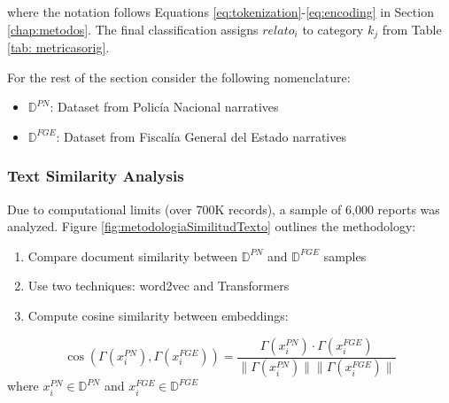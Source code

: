 \documentclass[onecolumn, journal, english, 12pt, a4paper]{IEEEtran} %
\theoremstyle{definition}
\begin{document}
where the notation follows Equations \ref{eq:tokenization}-\ref{eq:encoding} in Section \ref{chap:metodos}. The final classification assigns $relato_i$ to category $k_j$ from Table \ref{tab: metricasorig}.

For the rest of the section consider the following nomenclature:

\begin{itemize}
\item $\mathbb{D}^{PN}$: Dataset from Policía Nacional narratives
\item $\mathbb{D}^{FGE}$: Dataset from Fiscalía General del Estado narratives 
\end{itemize}

\subsubsection{Text Similarity Analysis}
Due to computational limits (over 700K records), a sample of 6,000 reports was analyzed. Figure \ref{fig:metodologiaSimilitudTexto} outlines the methodology:

\begin{enumerate}
    \item Compare document similarity between $\mathbb{D}^{PN}$ and $\mathbb{D}^{FGE}$ samples
    \item Use two techniques: word2vec and Transformers
    \item Compute cosine similarity between embeddings:
\end{enumerate}

\begin{equation}\label{eq:cosinesimilarity}         
        \cos(\Gamma(x_i^{PN}), \Gamma(x_i^{FGE})) = \frac{\Gamma(x_i^{PN})\cdot\Gamma(x_i^{FGE})}{\|\Gamma(x_i^{PN})\|\|\Gamma(x_i^{FGE})\|}
\end{equation}
where $x_i^{PN} \in \mathbb{D}^{PN}$ and $x_i^{FGE} \in \mathbb{D}^{FGE}$
\end{document}
